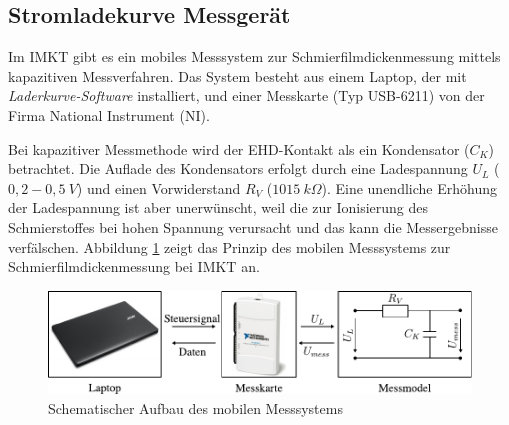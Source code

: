\subsection{Stromladekurve Messgerät}
\label{sub:stromladekurve_messgeraet}

Im IMKT gibt es ein mobiles Messsystem zur Schmierfilmdickenmessung mittels kapazitiven Messverfahren.
Das System besteht aus einem Laptop, der mit \textit{Laderkurve-Software} installiert, und einer Messkarte (Typ USB-6211) von der Firma National Instrument (NI).

Bei kapazitiver Messmethode wird der EHD-Kontakt als ein Kondensator ($C_K$) betrachtet.
Die Auflade des Kondensators erfolgt durch eine Ladespannung $U_L$ ($0,2 - 0,5 \ V$) und einen Vorwiderstand $R_V$ ($1015 \ k\Omega$).
Eine unendliche Erhöhung der Ladespannung ist aber unerwünscht, weil die zur Ionisierung des Schmierstoffes bei hohen Spannung verursacht und das kann die Messergebnisse verfälschen.
Abbildung \ref{fig:Schematischer_aufbau_des_mobilen_messsystems} zeigt das Prinzip des mobilen Messsystems zur Schmierfilmdickenmessung bei IMKT an.
\begin{figure}[htb]
    \centering
    \includegraphics[]{./images/schematischer_aufbau_des_mobilen_messsystem.pdf}
    \caption{Schematischer Aufbau des mobilen Messsystems}
    \label{fig:Schematischer_aufbau_des_mobilen_messsystems}
\end{figure}

